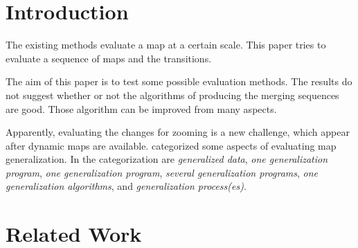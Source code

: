 \documentclass[ijgi,article,submit,moreauthors,pdftex]{Definitions/mdpi}
\begin{document}



\section{Introduction}





 
The existing methods evaluate a map at a certain scale.
This paper tries to evaluate a sequence of maps and the transitions.

The aim of this paper is to test some possible evaluation methods. 
The results do not suggest whether or not 
the algorithms of producing the merging sequences are good.
Those algorithm can be improved from many aspects.
 



Apparently, evaluating the changes for zooming is a new challenge,
which appear after dynamic maps are available.
\citet{Ruas2001Report} categorized some aspects of evaluating map generalization.
In the categorization are \emph{generalized data}, 
\emph{one generalization program}, \emph{one generalization program},
\emph{several generalization programs}, \emph{one generalization algorithms},
and \emph{generalization process(es)}.





 
 
 
 
 
 
 
\section{Related Work}
\label{sec:realted_work}
\end{document}
